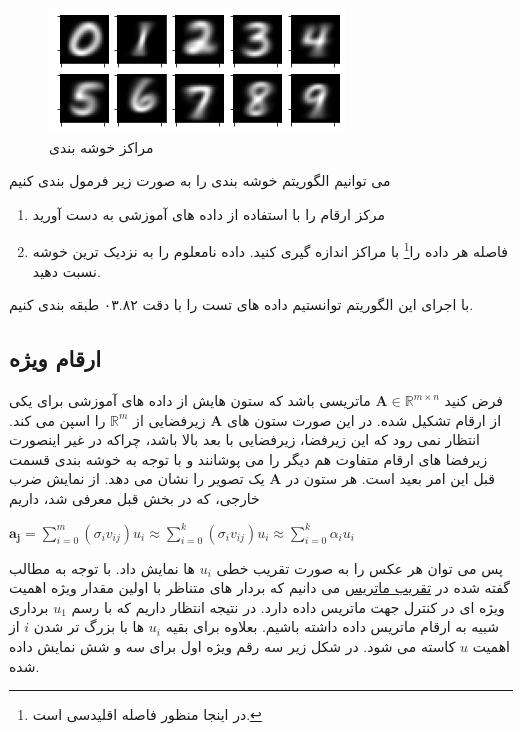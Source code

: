 	\begin{figure}[h]
		\centering
		\includegraphics[width=0.7\linewidth]{assets/centroids.png}
		\caption{مراکز خوشه بندی}
	\end{figure}
	می توانیم الگوریتم خوشه بندی را به صورت زیر فرمول بندی کنیم
	\begin{enumerate} 
		\item 
		مرکز ارقام را با استفاده از داده های آموزشی به دست آورید
		\item 
		فاصله هر داده را\footnote{در اینجا منظور فاصله اقلیدسی است.} با مراکز اندازه گیری کنید. داده نامعلوم را به نزدیک ترین خوشه نسبت دهید.
	\end{enumerate}
	با اجرای این الگوریتم توانستیم داده های تست را با دقت ۰۳.۸۲ طبقه بندی کنیم. 
	\pagebreak
	\subsection{ارقام ویژه}
فرض کنید $ \mathbf{A} \in \mathbb{R}^{m \times n} $ ماتریسی باشد که ستون هایش از داده های آموزشی برای یکی از ارقام تشکیل شده. در این صورت ستون های $ \mathbf{A} $ زیرفضایی از $\mathbb{R}^{m} $ را اسپن می کند. انتظار نمی رود که این زیرفضا، زیرفضایی با بعد بالا باشد، چراکه در غیر اینصورت زیرفضا های ارقام متفاوت هم دیگر را می پوشانند و با توجه به خوشه بندی قسمت قبل این امر بعید است. 
هر ستون در $ \mathbf{A} $ یک تصویر را نشان می دهد. از نمایش ضرب خارجی، که در بخش قبل معرفی شد،‌ داریم 
	\begin{center} 
		$ \mathbf{a_j} = \sum_{i=0}^{m} \left(\sigma_i v_{ij}\right) u_i \approx \sum_{i=0}^{k} \left(\sigma_i v_{ij}\right) u_i \approx \sum_{i=0}^{k} \alpha_i u_i$ 
	\end{center} 
	
	پس می توان هر عکس را به صورت تقریب خطی $ u_i $ ها نمایش داد. با توجه به مطالب گفته شده در \hyperref[sec:mat_approx]{تقریب ماتریس} می دانیم که بردار های متناظر با اولین مقدار ویژه اهمیت ویژه ای در کنترل جهت ماتریس داده دارد. در نتیجه انتظار داریم که با رسم $ u_1 $ برداری شبیه به ارقام ماتریس داده داشته باشیم. بعلاوه برای بقیه $ u_i $ ها با بزرگ تر شدن $ i $ از اهمیت $ u $ کاسته می شود. در شکل زیر سه رقم ویژه اول برای سه و شش نمایش داده شده. 
	
